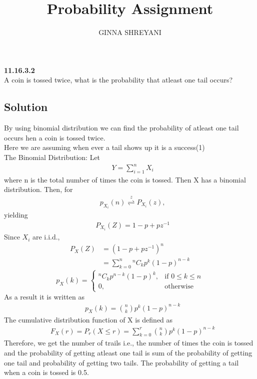 \documentclass[10pt,twocolumn]{article}
\title{
Probability Assignment
}
\author{GINNA SHREYANI}
\date{}
\newcommand*{\Comb}[2]{{}^{#1}C_{#2}}%
\begin{document}
\maketitle

\textbf{11.16.3.2}\\
A coin is tossed twice, what is the probability that atleast one tail occurs?\\
\subsection*{Solution}
By using binomial distribution we can find the probability of atleast one tail occurs hen a coin is tossed twice.\\
Here we are assuming when ever a tail shows up it is a success(1)\\
The Binomial Distribution: Let
\begin{align}
	&Y = \sum_{i=1}^n X_i
     \label{eq-1}
\end{align}
where n is the total number of times the coin is tossed. Then X has a binomial distribution. Then, for
\begin{align}
	&p_{X_i}(n){\stackrel{z}{\rightleftharpoons}}P_{X_i}(z),
     \label{eq-2}
\end{align}
yielding
\begin{align}
	&P_{X_i}(Z)= 1-p+pz^{-1}
	\label{eq-3}
\end{align}
Since $X_i$ are i.i.d.,
\begin{align}
	P_X(Z)&=(1-p+pz^{-1})^n\\
	&=\sum_{k=0}^n{\Comb{n}{k}p^{k}(1-p)^{n-k}}
\end{align}
\[
	p_X(k)=
	\begin{cases}
		\Comb{n}{k}p^{n-k}(1-p)^k,& \text{if } 0\leq k\leq n\\
		0,& \text{otherwise}
	\end{cases}
\]
As a result it is written as
\begin{align}
	\label{eq-6}
	&p_X(k)=\binom nk p^{k}(1-p)^{n-k}
\end{align}
The cumulative distribution function of X is defined as
\begin{align}
	&F_X(r)=P_r(X\leq r) = \sum_{k=0}^r\binom nk p^{k}(1-p)^{n-k}
	\label{eq-7}
\end{align}
Therefore, we get the number of trails i.e., the number of times the coin is tossed and the probability of getting atleast one tail is sum of the probability of getting one tail and probability of getting two tails.
The probability of getting a tail when a coin is tossed is 0.5.
\end{document}
